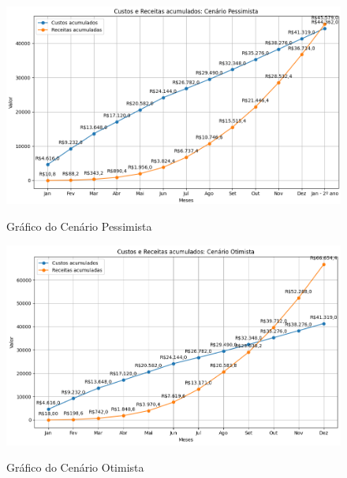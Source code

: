\begin{figure}[H]
        \center
	\caption{\label{fig_sge20}Gráfico do Cenário Pessimista}
    \includegraphics[scale=0.60]{imagens/viabilidadeFinanceira/Projeção-Receita_Custos-Pessimista.png}
    \label{cenarioPessimista}
\end{figure}

\begin{figure}[H]
        \center
	\caption{\label{fig_sge20}Gráfico do Cenário Otimista}
    \includegraphics[scale=0.60]{imagens/viabilidadeFinanceira/Projeção-Receita_Custos-Otimista.png}
    \label{cenarioOtimista}
\end{figure}